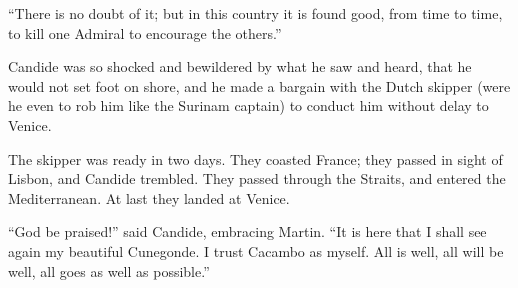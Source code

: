 ``There is no doubt of it; but in this country it is found good, from time to time, to kill one Admiral to encourage the others.''

Candide was so shocked and bewildered by what he saw and heard, that he would not set foot on shore, and he made a bargain with the Dutch skipper (were he even to rob him like the Surinam captain) to conduct him without delay to Venice.

The skipper was ready in two days. They coasted France; they passed in sight of Lisbon, and Candide trembled. They passed through the Straits, and entered the Mediterranean. At last they landed at Venice.

``God be praised!'' said Candide, embracing Martin. ``It is here that I shall see again my beautiful Cunegonde. I trust Cacambo as myself. All is well, all will be well, all goes as well as possible.''

